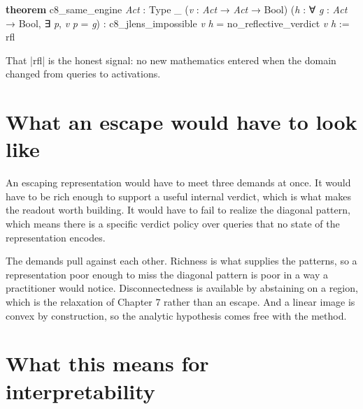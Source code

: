 \documentclass{memoir}
\begin{document}
\begin{LeanVerbatim}
\textbf{theorem} c8_same_engine \textit{Act} : Type _
    (\textit{v} : \textit{Act} → \textit{Act} → Bool)
    (\textit{h} : ∀ \textit{g} : \textit{Act} → Bool, ∃ \textit{p}, \textit{v} \textit{p} = \textit{g}) :
    c8_jlens_impossible \textit{v} \textit{h} = no_reflective_verdict \textit{v} \textit{h} :=
  rfl

\end{LeanVerbatim}


That \LeanVerb|rfl| is the honest signal: no new mathematics entered when the domain
changed from queries to activations.



\section{What an escape would have to look like}\label{Two--Schemas--of--Impossibility-005F-005F-005F--Machine--Checked--Limits--of--Trustworthy--Machine--Learning-005F-005F-005F--and--Why--They--Tighten--with--Capability----J--Space-005F-005F-005F--and--Why--It--Does--Not--Escape----What--an--escape--would--have--to--look--like}

An escaping representation would have to meet three demands at once. It would
have to be rich enough to support a useful internal verdict, which is what makes
the readout worth building. It would have to fail to realize the diagonal
pattern, which means there is a specific verdict policy over queries that no
state of the representation encodes.

The demands pull against each other. Richness is what supplies the patterns, so
a representation poor enough to miss the diagonal pattern is poor in a way a
practitioner would notice. Disconnectedness is available by abstaining on a
region, which is the relaxation of Chapter 7 rather than an escape. And a linear
image is convex by construction, so the analytic hypothesis comes free with the
method.



\section{What this means for interpretability}\label{Two--Schemas--of--Impossibility-005F-005F-005F--Machine--Checked--Limits--of--Trustworthy--Machine--Learning-005F-005F-005F--and--Why--They--Tighten--with--Capability----J--Space-005F-005F-005F--and--Why--It--Does--Not--Escape----What--this--means--for--interpretability}
\end{document}
